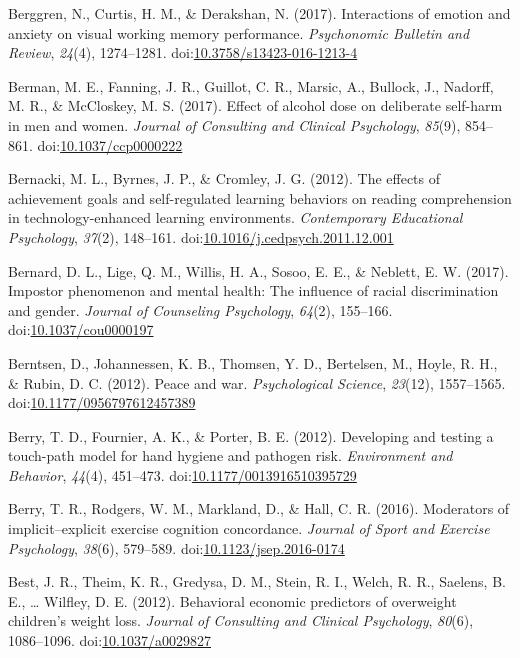 \documentclass[english,man]{apa6}
\theoremstyle{definition}
\theoremstyle{definition}
\theoremstyle{definition}
\theoremstyle{remark}
\begin{document}
\hypertarget{ref-Berggren2016}{}
Berggren, N., Curtis, H. M., \& Derakshan, N. (2017). Interactions of
emotion and anxiety on visual working memory performance.
\emph{Psychonomic Bulletin and Review}, \emph{24}(4), 1274--1281.
doi:\href{https://doi.org/10.3758/s13423-016-1213-4}{10.3758/s13423-016-1213-4}

\hypertarget{ref-Berman2017}{}
Berman, M. E., Fanning, J. R., Guillot, C. R., Marsic, A., Bullock, J.,
Nadorff, M. R., \& McCloskey, M. S. (2017). Effect of alcohol dose on
deliberate self-harm in men and women. \emph{Journal of Consulting and
Clinical Psychology}, \emph{85}(9), 854--861.
doi:\href{https://doi.org/10.1037/ccp0000222}{10.1037/ccp0000222}

\hypertarget{ref-Bernacki2012}{}
Bernacki, M. L., Byrnes, J. P., \& Cromley, J. G. (2012). The effects of
achievement goals and self-regulated learning behaviors on reading
comprehension in technology-enhanced learning environments.
\emph{Contemporary Educational Psychology}, \emph{37}(2), 148--161.
doi:\href{https://doi.org/10.1016/j.cedpsych.2011.12.001}{10.1016/j.cedpsych.2011.12.001}

\hypertarget{ref-Bernard2017}{}
Bernard, D. L., Lige, Q. M., Willis, H. A., Sosoo, E. E., \& Neblett, E.
W. (2017). Impostor phenomenon and mental health: The influence of
racial discrimination and gender. \emph{Journal of Counseling
Psychology}, \emph{64}(2), 155--166.
doi:\href{https://doi.org/10.1037/cou0000197}{10.1037/cou0000197}

\hypertarget{ref-Berntsen2012}{}
Berntsen, D., Johannessen, K. B., Thomsen, Y. D., Bertelsen, M., Hoyle,
R. H., \& Rubin, D. C. (2012). Peace and war. \emph{Psychological
Science}, \emph{23}(12), 1557--1565.
doi:\href{https://doi.org/10.1177/0956797612457389}{10.1177/0956797612457389}

\hypertarget{ref-Berry2012}{}
Berry, T. D., Fournier, A. K., \& Porter, B. E. (2012). Developing and
testing a touch-path model for hand hygiene and pathogen risk.
\emph{Environment and Behavior}, \emph{44}(4), 451--473.
doi:\href{https://doi.org/10.1177/0013916510395729}{10.1177/0013916510395729}

\hypertarget{ref-Berry2016}{}
Berry, T. R., Rodgers, W. M., Markland, D., \& Hall, C. R. (2016).
Moderators of implicit--explicit exercise cognition concordance.
\emph{Journal of Sport and Exercise Psychology}, \emph{38}(6), 579--589.
doi:\href{https://doi.org/10.1123/jsep.2016-0174}{10.1123/jsep.2016-0174}

\hypertarget{ref-Best2012}{}
Best, J. R., Theim, K. R., Gredysa, D. M., Stein, R. I., Welch, R. R.,
Saelens, B. E., \ldots{} Wilfley, D. E. (2012). Behavioral economic
predictors of overweight children's weight loss. \emph{Journal of
Consulting and Clinical Psychology}, \emph{80}(6), 1086--1096.
doi:\href{https://doi.org/10.1037/a0029827}{10.1037/a0029827}
\end{document}
